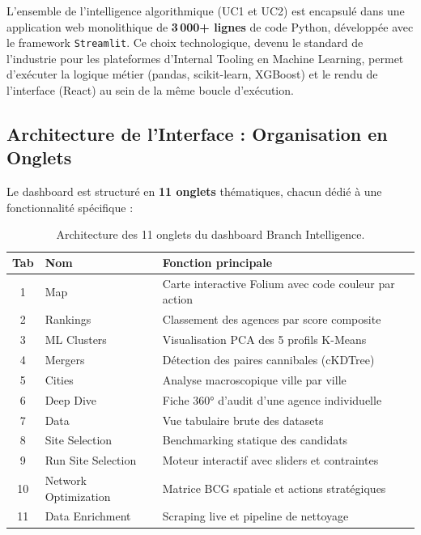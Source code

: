 L'ensemble de l'intelligence algorithmique (UC1 et UC2) est encapsulé dans une application web monolithique de \textbf{3\,000+ lignes} de code Python, développée avec le framework \texttt{Streamlit}. Ce choix technologique, devenu le standard de l'industrie pour les plateformes d'Internal Tooling en Machine Learning, permet d'exécuter la logique métier (pandas, scikit-learn, XGBoost) et le rendu de l'interface (React) au sein de la même boucle d'exécution.

\subsection{Architecture de l'Interface : Organisation en Onglets}

Le dashboard est structuré en \textbf{11 onglets} thématiques, chacun dédié à une fonctionnalité spécifique :

\begin{table}[h]
\centering
\begin{tabular}{|c|l|l|}
\hline
\textbf{Tab} & \textbf{Nom} & \textbf{Fonction principale} \\ \hline
1 & Map & Carte interactive Folium avec code couleur par action \\ \hline
2 & Rankings & Classement des agences par score composite \\ \hline
3 & ML Clusters & Visualisation PCA des 5 profils K-Means \\ \hline
4 & Mergers & Détection des paires cannibales (cKDTree) \\ \hline
5 & Cities & Analyse macroscopique ville par ville \\ \hline
6 & Deep Dive & Fiche 360° d'audit d'une agence individuelle \\ \hline
7 & Data & Vue tabulaire brute des datasets \\ \hline
8 & Site Selection & Benchmarking statique des candidats \\ \hline
9 & Run Site Selection & Moteur interactif avec sliders et contraintes \\ \hline
10 & Network Optimization & Matrice BCG spatiale et actions stratégiques \\ \hline
11 & Data Enrichment & Scraping live et pipeline de nettoyage \\ \hline
\end{tabular}
\caption{Architecture des 11 onglets du dashboard Branch Intelligence.}
\label{tab:dashboard_tabs}
\end{table}

